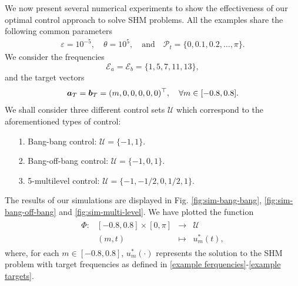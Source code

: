\documentclass[twocolumn]{autart}    %
\begin{document}
We now present several numerical experiments to show the effectiveness of our optimal control approach to solve SHM problems. All the examples share the following common parameters 
\begin{align*} 
	\varepsilon = 10^{-5},  \quad \theta = 10^5, \quad \text{and} \quad\mathcal{P}_t = \{0,0.1,0.2,\dots,\pi\}.
\end{align*} 
We consider the frequencies 
\begin{equation}\label{example ferquencies}
	\mathcal{E}_a = \mathcal{E}_b = \{1,5,7,11,13\},
\end{equation}
and the target vectors 
\begin{equation}\label{example targets}
	\bm{a}_T = \bm{b}_T = (m,0,0,0,0,0)^\top, \quad \forall m \in [-0.8,0.8].
\end{equation}
We shall consider three different control sets $\mathcal{U}$ which correspond to the aforementioned types of control:
\begin{itemize}
	\item[1.] Bang-bang control: $\mathcal{U} = \{-1,1\}$.
	\vspace{0.05cm}
	\item[2.] Bang-off-bang control:  $\mathcal{U} = \{-1,0,1\}$. 
	\vspace{0.05cm}
	\item[3.] 5-multilevel control: $\mathcal{U} = \{-1,-1/2,0,1/2,1\}$.
\end{itemize}

The results of our simulations are displayed in Fig. \ref{fig:sim-bang-bang}, \ref{fig:sim-bang-off-bang} and \ref{fig:sim-multi-level}.
We have plotted the function
\begin{align*} 
	\begin{array}{cccc}
		\Phi: & [-0.8, 0.8]\times [0,\pi] & \longrightarrow & \mathcal{U} 
		\\
 		& (m, t )  &\longmapsto & u_m^\ast (t),
	\end{array}
\end{align*}
where, for each $m \in [-0.8,0.8]$, $u_m^\ast (\cdot)$ represents the solution to the SHM problem with target frequencies as defined in \eqref{example ferquencies}-\eqref{example targets}. 
\end{document}
